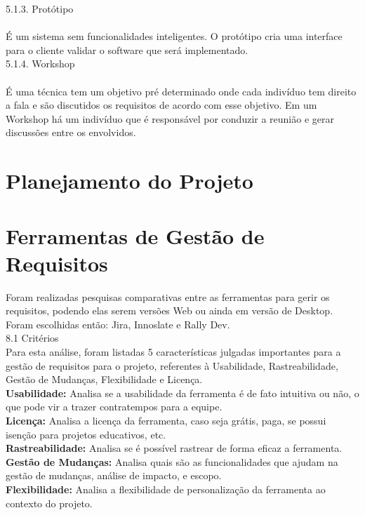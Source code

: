 {{{\large{5.1.3. Protótipo}}\\ \\
\tab É um sistema sem funcionalidades inteligentes. O protótipo cria uma interface para o cliente validar o software que será implementado.\\

{\large{5.1.4. Workshop}}\\ \\
\tab É uma técnica tem um objetivo pré determinado onde cada indivíduo tem direito a fala e são discutidos os requisitos de acordo com esse objetivo. Em um Workshop há um indivíduo que é responsável por conduzir a reunião e gerar discussões entre os envolvidos.\\

\label{sec:nova_sess_o}

\section{Planejamento do Projeto}
\label{sec:nova_sess_o}

\section{Ferramentas de Gestão de Requisitos}
\label{sec}
\tab Foram realizadas pesquisas comparativas entre as ferramentas para gerir os requisitos, podendo elas serem versões Web ou ainda em versão de Desktop. Foram escolhidas então: Jira, Innoslate e Rally Dev.\\

{\large{8.1 Critérios}}\\

\tab Para esta análise, foram listadas 5 características julgadas importantes para a gestão de requisitos para o projeto, referentes à Usabilidade, Rastreabilidade, Gestão de Mudanças, Flexibilidade e Licença.\\
\tab \textbf{Usabilidade:} Analisa se a usabilidade da ferramenta é de fato intuitiva ou não, o que pode vir a trazer contratempos para a equipe.\\
\tab \textbf{Licença:} Analisa a licença da ferramenta, caso seja grátis, paga, se possui isenção para projetos educativos, etc.\\
\tab \textbf{Rastreabilidade:} Analisa se é possível rastrear de forma eficaz a ferramenta.\\
\tab \textbf{Gestão de Mudanças:} Analisa quais são as funcionalidades que ajudam na gestão de mudanças, análise de impacto, e escopo.\\
\tab \textbf{Flexibilidade:} Analisa a flexibilidade de personalização da ferramenta ao contexto do projeto.\\

}}
